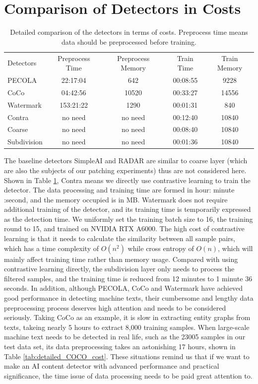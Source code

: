 \documentclass[11pt]{article}
\begin{document}
\section{Comparison of Detectors in Costs}
\label{sec:cost_comparison}
\begin{table}[ht]
	\centering
	\renewcommand{\arraystretch}{1.1}
	\begin{tabular}{lcccc}
			\toprule
			\multirow{2}{*}{Detectors} & 
			\multirow{2}{*}{Preprocess Time} & 
			\multirow{2}{*}{Preprocess Memory} & 
			\multirow{2}{*}{Train Time} & 
			\multirow{2}{*}{Train Memory} \\
			& & & & \\
			\midrule
			PECOLA & 22:17:04 & 642 & 00:08:55 & 9228 \\
			CoCo      & 04:42:56 & 10520 & 00:33:27 & 14556 \\
			Watermark  & 153:21:22 & 1290 & 00:01:31  & 840 \\
			Contra & no need & no need & 00:12:40 & 10840 \\
			Coarse & no need & no need & 00:08:40 & 10840 \\
			Subdivision & no need & no need & 00:01:36 & 10840 \\
			\bottomrule
	\end{tabular}
	\caption{Detailed comparison of the detectors in terms of costs. Preprocess time means data should be preprocessed before training.}
	\label{tab:detailed_compare_cost}
\end{table}
The baseline detectors SimpleAI and RADAR are similar to coarse layer (which are also the subjects of our patching experiments) thus are not considered here. Shown in Table \ref{tab:detailed_compare_cost}, Contra means we directly use contrastive learning to train the detector. The data processing and training time are formed in hour: minute :second, and the memory occupied is in MB. Watermark does not require additional training of the detector, and its training time is temporarily expressed as the detection time. We uniformly set the training batch size to 16, the training round to 15, and trained on NVIDIA RTX A6000. The high cost of contrastive learning is that it needs to calculate the similarity between all sample pairs, which has a time complexity of $O(n^2)$ while cross entropy of $O(n)$, which will mainly affect training time rather than memory usage. Compared with using contrastive learning directly, the subdivision layer only needs to process the filtered samples, and the training time is reduced from 12 minutes to 1 minute 36 seconds. In addition, although PECOLA, CoCo and Watermark have achieved good performance in detecting machine texts, their cumbersome and lengthy data preprocessing process deserves high attention and needs to be considered seriously. Taking CoCo as an example, it is slow in extracting entity graphs from texts,  takeing nearly 5 hours to extract 8,000 training samples. When large-scale machine text needs to be detected in real life, such as the 23005 samples in our test data set, its data preprocessing takes an astonishing 17 hours, shown in Table \ref{tab:detailed_COCO_cost}. These situations remind us that if we want to make an AI content detector with advanced performance and practical significance, the time issue of data processing needs to be paid great attention to.
\end{document}
